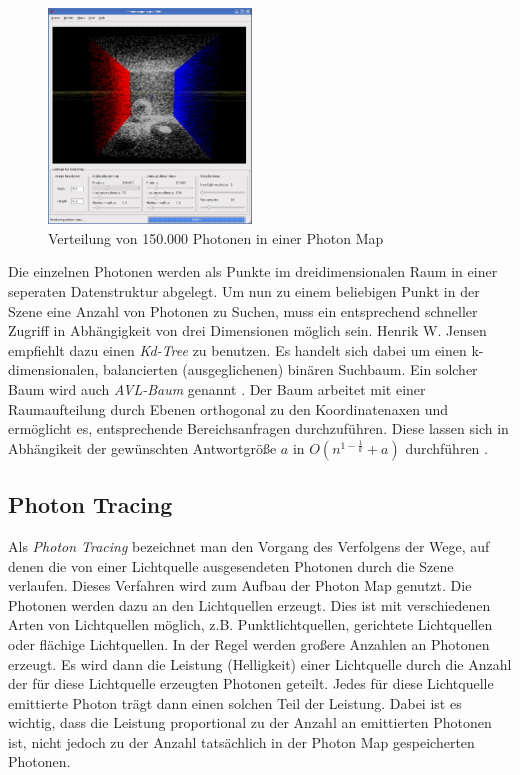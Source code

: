 \documentclass[a4paper,twocolumn,abstracton]{scrartcl}
\begin{document}
\begin{figure}[htb]
\centering
\includegraphics[width=0.48\textwidth]{img/global}
\caption{Verteilung von 150.000 Photonen in einer Photon Map}
\label{fig:global}
\end{figure}

Die einzelnen Photonen werden als Punkte im dreidimensionalen Raum in einer seperaten Datenstruktur abgelegt. Um nun zu einem beliebigen Punkt in der Szene eine Anzahl von Photonen zu Suchen, muss ein entsprechend schneller Zugriff in Abhängigkeit von drei Dimensionen möglich sein. Henrik W. Jensen empfiehlt dazu einen \emph{Kd-Tree} zu benutzen. Es handelt sich dabei um einen k-dimensionalen, balancierten (ausgeglichenen) binären Suchbaum. Ein solcher Baum wird auch \emph{AVL-Baum} genannt \citep{Duden2001a, Duden2001b}. Der Baum arbeitet mit einer Raumaufteilung durch Ebenen orthogonal zu den Koordinatenaxen und ermöglicht es, entsprechende Bereichsanfragen durchzuführen. Diese lassen sich in Abhängikeit der gewünschten Antwortgröße $a$ in $O(n^{1-\frac{1}{k}}+a)$ durchführen \citep{Wikipedia2007b}.

\subsection{Photon Tracing}
Als \emph{Photon Tracing} bezeichnet man den Vorgang des Verfolgens der Wege, auf denen die von einer Lichtquelle ausgesendeten Photonen durch die Szene verlaufen. Dieses Verfahren wird zum Aufbau der Photon Map genutzt. Die Photonen werden dazu an den Lichtquellen erzeugt. Dies ist mit verschiedenen Arten von Lichtquellen möglich, z.B. Punktlichtquellen, gerichtete Lichtquellen oder flächige Lichtquellen. In der Regel werden großere Anzahlen an Photonen erzeugt. Es wird dann die Leistung (Helligkeit) einer Lichtquelle durch die Anzahl der für diese Lichtquelle erzeugten Photonen geteilt. Jedes für diese Lichtquelle emittierte Photon trägt dann einen solchen Teil der Leistung. Dabei ist es wichtig, dass die Leistung proportional zu der Anzahl an emittierten Photonen ist, nicht jedoch zu der Anzahl tatsächlich in der Photon Map gespeicherten Photonen.
\end{document}
